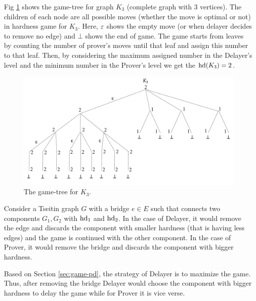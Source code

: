 \documentclass{report}
\begin{document}
\begin{examp}\label{exp:gg1}
Fig \ref{fig:gg1} shows the game-tree for graph $K_3$ (complete graph with 3 vertices). The children of each node are all possible moves (whether the move is optimal or not) in hardness game for $K_3$. Here, $\varepsilon $ shows the empty move (or when delayer decides to remove no edge) and $\bot$ shows the end of game. The game starts from leaves by counting the number of prover's moves until that leaf and assign this number to that leaf. Then, by considering the maximum assigned number in the Delayer's level and the minimum number in the Prover's level we get the $\operatorname{hd}(K_3)=2$.
   \begin{figure}
   \begin{center}
   \includegraphics[scale =0.45]{gg1.png}
   \caption{The game-tree for $K_3$.}
   \label{fig:gg1}
   \end{center}
   \end{figure}
\end{examp}


\begin{lem}\label{lem:tseitin-game-bridge}
Consider a Tseitin graph $G$ with a bridge $e \in E$ such that connects two components $G_1,G_2$ with $\operatorname{hd}_1$ and $\operatorname{hd}_2$. In the case of Delayer, it would remove the edge and discards the component with smaller hardness (that is having less edges) and the game is continued with the other component. In the case of Prover, it would remove the bridge and discards the component with bigger hardness.
\end{lem}
\begin{prf}
Based on Section \ref{sec:game-pd}, the strategy of Delayer is to maximize the game. Thus, after removing the bridge Delayer would choose the component with bigger hardness to delay the game while for Prover it is vice verse.
\end{prf}
\end{document}
